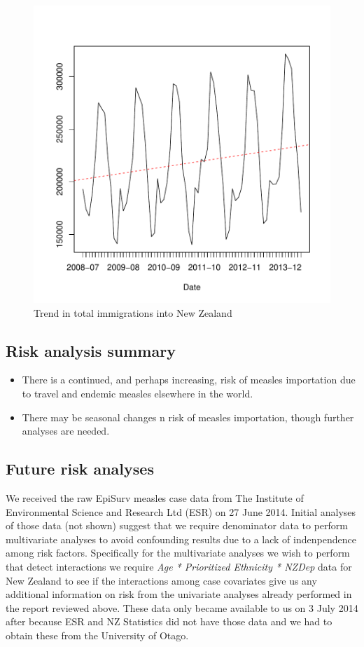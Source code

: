 \documentclass{article}
\begin{document}
\begin{figure}[h!]
\begin{center}
\includegraphics{interimreport1-012}
\end{center}
\caption{Trend in total immigrations into New Zealand}
\label{fig:trendimmigration}
\end{figure}

\subsection{Risk analysis summary}
\begin{itemize}
\item There is a continued, and perhaps increasing, risk of measles importation due to travel and endemic measles elsewhere in the world.
\item There may be seasonal changes n risk of measles importation, though further analyses are needed.
\end{itemize}

\subsection{Future risk analyses}
We received the raw EpiSurv measles case data from The Institute of Environmental Science and Research Ltd (ESR) on 27 June 2014. Initial analyses of those data (not shown) suggest that we require denominator data to perform multivariate analyses to avoid confounding results due to a lack of indenpendence among risk factors. Specifically for the multivariate analyses we wish to perform that detect interactions we require \emph{Age * Prioritized Ethnicity * NZDep} data for New Zealand to see if the interactions among case covariates give us any additional information on risk from the univariate analyses already performed in the report reviewed above. These data only became available to us on 3 July 2014 after because ESR and NZ Statistics did not have those data and we had to obtain these from the University of Otago. 
\end{document}
